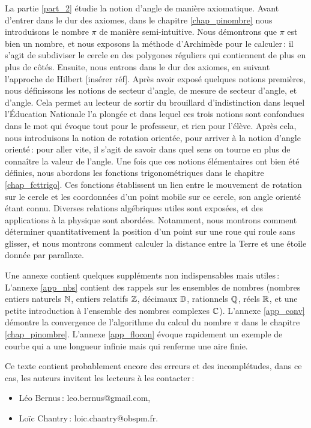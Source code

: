 La partie \ref{part_2} étudie la notion d'angle de manière axiomatique. Avant d'entrer dans le dur des axiomes, dans le chapitre \ref{chap_pinombre} nous introduisons le nombre $\pi$ de manière semi-intuitive. Nous démontrons que $\pi$ est bien un nombre, et nous exposons la méthode d'Archimède pour le calculer\,: il s'agit de subdiviser le cercle en des polygones réguliers qui contiennent de plus en plus de côtés.
Ensuite, nous entrons dans le dur des axiomes, en suivant l'approche de Hilbert [insérer réf]. Après avoir exposé quelques notions premières, nous définissons les notions de secteur d'angle, de mesure de secteur d'angle, et d'angle. Cela permet au lecteur de sortir du brouillard d'indistinction dans lequel l'Éducation Nationale l'a plongée et dans lequel ces trois notions sont confondues dans le mot  qui évoque tout pour le professeur, et rien pour l'élève. Après cela, nous introduisons la notion de rotation orientée, pour arriver à la notion d'angle orienté\,: pour aller vite, il s'agit de savoir dans quel sens on tourne en plus de connaître la valeur de l'angle.
Une fois que ces notions élémentaires ont bien été définies, nous abordons les fonctions trigonométriques dans le chapitre \ref{chap_fcttrigo}. Ces fonctions établissent un lien entre le mouvement de rotation sur le cercle et les coordonnées d'un point mobile sur ce cercle, son angle orienté étant connu. Diverses relations algébriques utiles sont exposées, et des applications à la physique sont abordées. Notamment, nous montrons comment déterminer quantitativement la position d'un point sur une roue qui roule sans glisser, et nous montrons comment calculer la distance entre la Terre et une étoile donnée par parallaxe. 

Une annexe contient quelques suppléments non indispensables mais utiles\,: L'annexe \ref{app_nbs} contient des rappels sur les ensembles de nombres (nombres entiers naturels $\mathbb{N}$, entiers relatifs $\mathbb{Z}$, décimaux $\mathbb{D}$, rationnels $\mathbb{Q}$, réels $\mathbb{R}$, et une petite introduction à l'ensemble des nombres complexes $\mathbb{C}$). L'annexe \ref{app_conv} démontre la convergence de l'algorithme du calcul du nombre $\pi$ dans le chapitre \ref{chap_pinombre}. L'annexe \ref{app_flocon} évoque rapidement un exemple de courbe qui a une longueur infinie mais qui renferme une aire finie. 

Ce texte contient probablement encore des erreurs et des incomplétudes, dans ce cas, les auteurs invitent les lecteurs à les contacter\,:
\begin{itemize}[$\bullet$]
    \item Léo Bernus\,: leo.bernus@gmail.com,
    \item Loïc Chantry\,: loic.chantry@obspm.fr.
\end{itemize}


